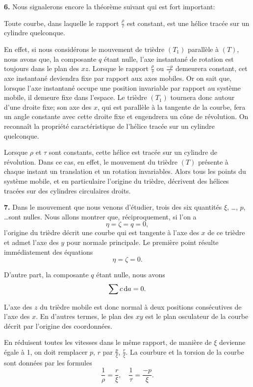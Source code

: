 \textbf{6.} Nous signalerons encore la théorème suivant qui est fort important:
\begin{thm}
	Toute courbe, dans laquelle le rapport $\frac\rho\tau$ est constant, est une hélice tracée sur un cylindre 
	quelconque.
\end{thm}

En effet, si nous considérons le mouvement de trièdre $(T_1)$ parallèle à $(T)$, nous avons que, la composante $q$ 
étant nulle, l'axe instantané de rotation est toujours dans le plan des $xz$. Lorsque le rapport $\frac\rho\tau$ ou 
$\frac{-p}{r}$ demeurera constant, cet axe instantané deviendra fixe par rapport aux axes mobiles. Or on sait que, 
lorsque l'axe instantané occupe une position invariable par rapport au système mobile, il demeure fixe dans l'espace. 
Le trièdre $(T_1)$ tournera donc autour d'une droite fixe; son axe des $x$, qui est parallèle à la tangente de la 
courbe, fera un angle constante avec cette droite fixe et engendrera un cône de révolution. On reconnaît la propriété 
caractéristique de l'hélice tracée sur un cylindre quelconque.

Lorsque $\rho$ et $\tau$ sont constants, cette hélice est tracée sur un cylindre de révolution. Dans ce cas, en effet, 
le mouvement du trièdre $(T)$ présente à chaque instant un translation et un rotation invariables. Alors tous les 
points du système mobile, et en particulaire l'origine du trièdre, décrivent des hélices tracées sur des cylindres 
circulaires droits.

\textbf{7.} Dans le mouvement que nous venons d'étudier, trois des six quantités $\xi$, \ldots, $p$, \ldots sont 
nulles. Nous allons montrer que, réciproquement, si l'on a
\[
	\eta = \zeta = q = 0,
\]
l'origine du trièdre décrit une courbe qui est tangente à l'axe des $x$ de ce trièdre et admet l'axe des $y$ pour 
normale principale. Le première point résulte immédiatement des équations
\[
	\eta = \zeta = 0.
\]

D'autre part, la composante $q$ étant nulle, nous avons
\[
	\sum{c \ensuremath{\operatorname{d}\!{a}}} = 0.
\]

L'axe des $z$ du trièdre mobile est donc normal à deux positions consécutives de l'axe des $x$. En d'autres termes, le 
plan des $xy$ est le plan osculateur de la courbe décrit par l'origine des coordonnées.

En réduisent toutes les vitesses dans le même rapport, de manière de $\xi$ devienne égale à 1, on doit remplacer $p$, 
$r$ par $\frac{p}{\xi}$, $\frac{r}{\xi}$. La courbure et la torsion de la courbe sont données par les formules
\begin{equation}
	\frac{1}{\rho} = \frac{r}{\xi}, \quad \frac{1}{\tau} = \frac{-p}{\xi}.
	\label{eqn-1.16}
\end{equation}

